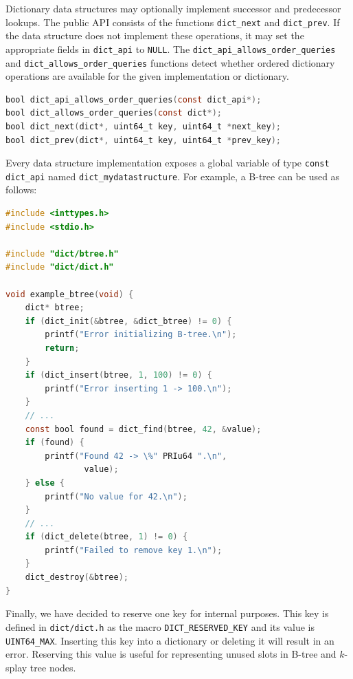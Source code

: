 Dictionary data structures may optionally implement successor and predecessor
lookups. The public API consists of the functions \texttt{dict\_next} and
\texttt{dict\_prev}. If the data structure does not implement these operations,
it may set the appropriate fields in \texttt{dict\_api} to \texttt{NULL}.
The \texttt{dict\_api\_allows\_order\_queries} and
\texttt{dict\_allows\_order\_queries} functions detect whether ordered
dictionary operations are available for the given implementation or dictionary.
\begin{lstlisting}[language=C]
bool dict_api_allows_order_queries(const dict_api*);
bool dict_allows_order_queries(const dict*);
bool dict_next(dict*, uint64_t key, uint64_t *next_key);
bool dict_prev(dict*, uint64_t key, uint64_t *prev_key);
\end{lstlisting}

Every data structure implementation exposes a global variable of type
\texttt{const dict\_api} named \texttt{dict\_mydatastructure}. For example,
a B-tree can be used as follows:

\begin{lstlisting}[language=C]
#include <inttypes.h>
#include <stdio.h>

#include "dict/btree.h"
#include "dict/dict.h"

void example_btree(void) {
	dict* btree;
	if (dict_init(&btree, &dict_btree) != 0) {
		printf("Error initializing B-tree.\n");
		return;
	}
	if (dict_insert(btree, 1, 100) != 0) {
		printf("Error inserting 1 -> 100.\n");
	}
	// ...
	const bool found = dict_find(btree, 42, &value);
	if (found) {
		printf("Found 42 -> \%" PRIu64 ".\n",
				value);
	} else {
		printf("No value for 42.\n");
	}
	// ...
	if (dict_delete(btree, 1) != 0) {
		printf("Failed to remove key 1.\n");
	}
	dict_destroy(&btree);
}
\end{lstlisting}

Finally, we have decided to reserve one key for internal purposes.
This key is defined in \texttt{dict/dict.h} as the macro
\texttt{DICT\_RESERVED\_KEY} and its value is \texttt{UINT64\_MAX}.
Inserting this key into a dictionary or deleting it will result in an error.
Reserving this value is useful for representing unused slots in B-tree
and $k$-splay tree nodes.

